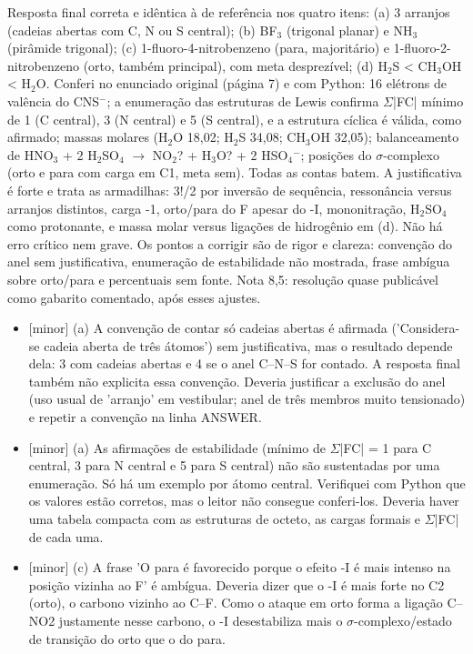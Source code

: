 \documentclass{article}%
\begin{document}
Resposta final correta e idêntica à de referência nos quatro itens: (a) 3 arranjos (cadeias abertas com C, N ou S central); (b) BF$_{3}$ (trigonal planar) e NH$_{3}$ (pirâmide trigonal); (c) 1{-}fluoro{-}4{-}nitrobenzeno (para, majoritário) e 1{-}fluoro{-}2{-}nitrobenzeno (orto, também principal), com meta desprezível; (d) H$_{2}$S < CH$_{3}$OH < H$_{2}$O. Conferi no enunciado original (página 7) e com Python: 16 elétrons de valência do CNS$^{-}$; a enumeração das estruturas de Lewis confirma $\Sigma$|FC| mínimo de 1 (C central), 3 (N central) e 5 (S central), e a estrutura cíclica é válida, como afirmado; massas molares (H$_{2}$O 18,02; H$_{2}$S 34,08; CH$_{3}$OH 32,05); balanceamento de HNO$_{3}$ + 2 H$_{2}$SO$_{4}$ $\to$ NO$_{2}$? + H$_{3}$O? + 2 HSO$_{4}$$^{-}$; posições do $\sigma${-}complexo (orto e para com carga em C1, meta sem). Todas as contas batem. A justificativa é forte e trata as armadilhas: 3!/2 por inversão de sequência, ressonância versus arranjos distintos, carga -1, orto/para do F apesar do -I, mononitração, H$_{2}$SO$_{4}$ como protonante, e massa molar versus ligações de hidrogênio em (d). Não há erro crítico nem grave. Os pontos a corrigir são de rigor e clareza: convenção do anel sem justificativa, enumeração de estabilidade não mostrada, frase ambígua sobre orto/para e percentuais sem fonte. Nota 8,5: resolução quase publicável como gabarito comentado, após esses ajustes.%
\begin{itemize}%
\item%
{[}minor{]} (a) A convenção de contar só cadeias abertas é afirmada ('Considera{-}se cadeia aberta de três átomos') sem justificativa, mas o resultado depende dela: 3 com cadeias abertas e 4 se o anel C--N--S for contado. A resposta final também não explicita essa convenção. Deveria justificar a exclusão do anel (uso usual de 'arranjo' em vestibular; anel de três membros muito tensionado) e repetir a convenção na linha ANSWER.%
\item%
{[}minor{]} (a) As afirmações de estabilidade (mínimo de $\Sigma$|FC| = 1 para C central, 3 para N central e 5 para S central) não são sustentadas por uma enumeração. Só há um exemplo por átomo central. Verifiquei com Python que os valores estão corretos, mas o leitor não consegue conferi{-}los. Deveria haver uma tabela compacta com as estruturas de octeto, as cargas formais e $\Sigma$|FC| de cada uma.%
\item%
{[}minor{]} (c) A frase 'O para é favorecido porque o efeito -I é mais intenso na posição vizinha ao F' é ambígua. Deveria dizer que o -I é mais forte no C2 (orto), o carbono vizinho ao C--F. Como o ataque em orto forma a ligação C--NO2 justamente nesse carbono, o -I desestabiliza mais o $\sigma${-}complexo/estado de transição do orto que o do para.%

\end{itemize}$$
\end{document}
